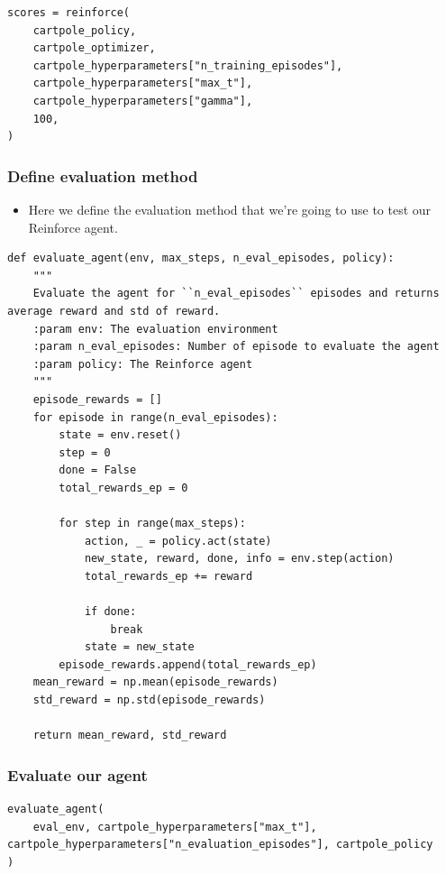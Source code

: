 \documentclass[11pt,a4paper]{article}
\begin{document}
\begin{lstlisting}
scores = reinforce(
    cartpole_policy,
    cartpole_optimizer,
    cartpole_hyperparameters["n_training_episodes"],
    cartpole_hyperparameters["max_t"],
    cartpole_hyperparameters["gamma"],
    100,
)
\end{lstlisting}

\subsubsection{Define evaluation method}\label{define-evaluation-method}

\begin{itemize}
\tightlist
\item
  Here we define the evaluation method that we're going to use to test our Reinforce agent.
\end{itemize}

\begin{lstlisting}
def evaluate_agent(env, max_steps, n_eval_episodes, policy):
    """
    Evaluate the agent for ``n_eval_episodes`` episodes and returns average reward and std of reward.
    :param env: The evaluation environment
    :param n_eval_episodes: Number of episode to evaluate the agent
    :param policy: The Reinforce agent
    """
    episode_rewards = []
    for episode in range(n_eval_episodes):
        state = env.reset()
        step = 0
        done = False
        total_rewards_ep = 0

        for step in range(max_steps):
            action, _ = policy.act(state)
            new_state, reward, done, info = env.step(action)
            total_rewards_ep += reward

            if done:
                break
            state = new_state
        episode_rewards.append(total_rewards_ep)
    mean_reward = np.mean(episode_rewards)
    std_reward = np.std(episode_rewards)

    return mean_reward, std_reward
\end{lstlisting}

\subsubsection{Evaluate our agent}\label{evaluate-our-agent}

\begin{lstlisting}
evaluate_agent(
    eval_env, cartpole_hyperparameters["max_t"], cartpole_hyperparameters["n_evaluation_episodes"], cartpole_policy
)
\end{lstlisting}
\end{document}
